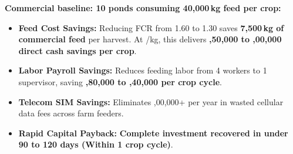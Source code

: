 \documentclass[10pt,a4paper]{article}
\begin{document}
\begin{minipage}[t]{0.488\linewidth}
  \begin{tcolorbox}[
    enhanced,
    colback=EmeraldBg,
    colframe=EmeraldBorder,
    arc=2mm,
    boxrule=1.1pt,
    title={\fontsize{8.5}{10.5}\selectfont \textbf{\textcolor{white}{Customer ROI Model: 10-Hectare Farm (Indian Rupees)}}},
    coltitle=white,
    colbacktitle=EmeraldGreen,
    top=6pt, bottom=6pt, left=8pt, right=8pt
  ]
    {\fontsize{7.5}{9.8}\selectfont \textcolor{TextPrimary}{
    \textbf{Commercial baseline: 10 ponds consuming 40,000\,kg feed per crop:}
    \begin{itemize}[leftmargin=10pt, itemsep=2.5pt, topsep=2pt, parsep=0pt]
      \item \textbf{Feed Cost Savings:} Reducing FCR from 1.60 to 1.30 saves \textbf{7,500\,kg of commercial feed} per harvest. At /kg, this delivers \textbf{,50,000 to ,00,000 direct cash savings per crop}.
      \item \textbf{Labor Payroll Savings:} Reduces feeding labor from 4 workers to 1 supervisor, saving \textbf{,80,000 to ,40,000 per crop cycle}.
      \item \textbf{Telecom SIM Savings:} Eliminates ,00,000+ per year in wasted cellular data fees across farm feeders.
      \item \textbf{Rapid Capital Payback:} \textbf{Complete investment recovered in under 90 to 120 days (Within 1 crop cycle)}.
    \end{itemize}
    }}
  \end{tcolorbox}
\end{minipage}
\hfill
\end{document}

